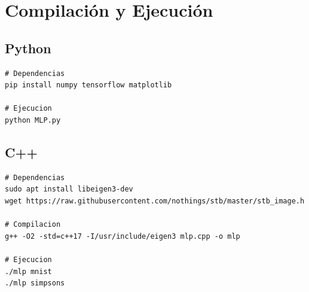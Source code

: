\section*{Compilación y Ejecución}

\subsection*{Python}
\begin{lstlisting}[style=python, numbers=none]
# Dependencias
pip install numpy tensorflow matplotlib

# Ejecucion
python MLP.py
\end{lstlisting}

\subsection*{C++}
\begin{lstlisting}[style=cpp, numbers=none]
# Dependencias
sudo apt install libeigen3-dev
wget https://raw.githubusercontent.com/nothings/stb/master/stb_image.h

# Compilacion
g++ -O2 -std=c++17 -I/usr/include/eigen3 mlp.cpp -o mlp

# Ejecucion
./mlp mnist
./mlp simpsons
\end{lstlisting}
